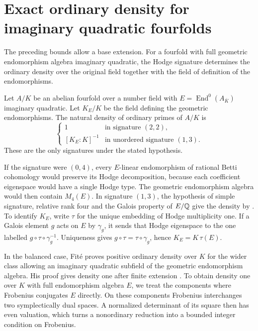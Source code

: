 \section{Exact ordinary density for imaginary quadratic fourfolds}
\label{sec:fourfold}

The preceding bounds allow a base extension. For a fourfold with full
geometric endomorphism algebra imaginary quadratic, the Hodge signature
determines the ordinary density over the original field together with the
field of definition of the endomorphisms.

\begin{theorem}\label{thm:fourfold-density}
Let \(A/K\) be an abelian fourfold over a number field with
\(E=\operatorname{End}^0(A_{\overline K})\) imaginary quadratic. Let
\(K_E/K\) be the field defining the geometric endomorphisms. The natural
density of ordinary primes of \(A/K\) is
\[
 \begin{cases}
  1 & \text{in signature }(2,2),\\
  [K_E:K]^{-1} & \text{in unordered signature }(1,3).
 \end{cases}
\]
These are the only signatures under the stated hypothesis.
\end{theorem}

If the signature were \((0,4)\), every \(E\)-linear endomorphism of
rational Betti cohomology would preserve its Hodge decomposition,
because each coefficient eigenspace would have a single Hodge type.
The geometric endomorphism algebra would then contain \(M_4(E)\).
In signature \((1,3)\), the hypothesis of simple signature, relative
rank four and the Galois property of \(E/\mathbb Q\) give the density by
\cite[Theorem~4.18]{cantoral}. To identify \(K_E\), write \(\tau\)
for the unique embedding of Hodge multiplicity one. If a Galois
element \(g\) acts on \(E\) by \(\gamma_g\), it sends that Hodge
eigenspace to the one labelled \(g\circ\tau\circ\gamma_g^{-1}\).
Uniqueness gives \(g\circ\tau=\tau\circ\gamma_g\), hence \(K_E=K\,\tau(E)\).

In the balanced case, Fit\'e proves positive ordinary density over
\(K\) for the wider class allowing an imaginary quadratic subfield of
the geometric endomorphism algebra. His proof gives density one after
finite extension \cite[Theorem~4 and \S8]{fite}. To obtain density one
over \(K\) with full endomorphism algebra \(E\), we treat the components
where Frobenius conjugates \(E\) directly. On these components Frobenius
interchanges two symplectically dual spaces. A normalized determinant
of its square then has even valuation, which turns a nonordinary
reduction into a bounded integer condition on Frobenius.

